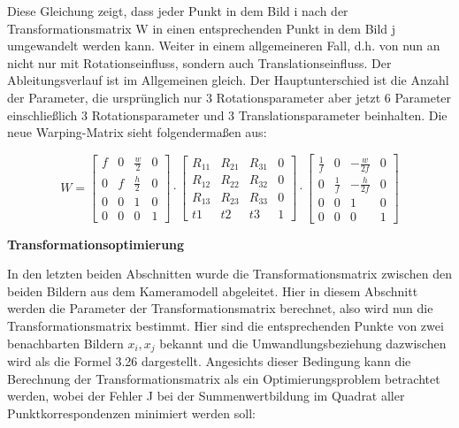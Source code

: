 Diese Gleichung zeigt, dass jeder Punkt in dem Bild i nach der Transformationsmatrix W in einen entsprechenden Punkt in dem Bild j umgewandelt werden kann. Weiter in einem allgemeineren Fall, d.h. von nun an nicht nur mit Rotationseinfluss, sondern auch Translationseinfluss. Der Ableitungsverlauf ist im Allgemeinen gleich. Der Hauptunterschied ist die Anzahl der Parameter, die ursprünglich nur 3 Rotationsparameter aber jetzt 6 Parameter einschließlich 3 Rotationsparameter und 3 Translationsparameter beinhalten. Die neue Warping-Matrix sieht folgendermaßen aus:

\begin{equation}
   W = \begin{bmatrix}
	f			& 0 		& \frac{w}{2}	  & 0 \\
	0	 		& f			& \frac{h}{2} 	  & 0 \\
	0     		& 0 		& 1 			  & 0 \\	
	0     		& 0 		& 0 			  & 1
	\end{bmatrix} \cdot \begin{bmatrix}
	R_{11}			& R_{21}  		& R_{31}	  & 0 \\
	R_{12}	 		& R_{22}		& R_{32}	  & 0 \\
	R_{13}     		& R_{23} 		& R_{33} 	  & 0 \\	
	t1     			& t2 			& t3 		  & 1
	\end{bmatrix} \cdot \begin{bmatrix}
	\frac{1}{f}	   & 0 				& -\frac{w}{2f}	  & 0 \\
	0	 		   & \frac{1}{f}	& -\frac{h}{2f}   & 0 \\
	0     		   & 0 		        & 1 			  & 0 \\	
	0     		   & 0 		        & 0 			  & 1
	\end{bmatrix}
\end{equation}

\textbf{Transformationsoptimierung}

In den letzten beiden Abschnitten wurde die Transformationsmatrix zwischen den beiden Bildern aus dem Kameramodell abgeleitet. Hier in diesem Abschnitt werden die Parameter der Transformationsmatrix berechnet, also wird nun die Transformationsmatrix bestimmt. Hier sind die entsprechenden Punkte von zwei benachbarten Bildern $x_i, x_j$ bekannt und die Umwandlungsbeziehung dazwischen wird als die Formel 3.26 dargestellt. Angesichts dieser Bedingung 
kann die Berechnung der Transformationsmatrix \cite{Karpenko} als ein Optimierungsproblem betrachtet werden, wobei der Fehler J bei der Summenwertbildung im Quadrat aller Punktkorrespondenzen minimiert werden soll:

